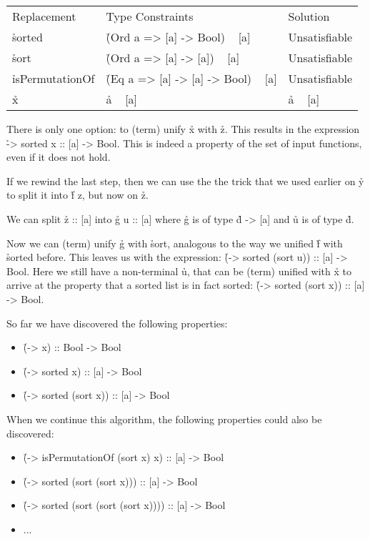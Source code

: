 \documentclass[a4paper, 11pt]{article}
\begin{document}
\begin{tabular}{lll}
  Replacement & Type Constraints & Solution \\
  \h{sorted} & \h{(Ord a => [a] -> Bool) ~ [a]} & Unsatisfiable \\
  \h{sort} & \h{(Ord a => [a] -> [a]) ~ [a]} & Unsatisfiable \\
  \h{isPermutationOf} & \h{(Eq a => [a] -> [a] -> Bool) ~ [a]} & Unsatisfiable \\
  \h{x} & \h{a ~ [a]} & \h{a ~ [a]} \\
\end{tabular}

There is only one option: to (term) unify \h{x} with \h{z}.
This results in the expression \h{\a -> sorted x :: [a] -> Bool}.
This is indeed a property of the set of input functions, even if it does not hold.

If we rewind the last step, then we can use the the trick that we used earlier on \h{y} to split it into \h{f z}, but now on \h{z}.

We can split \h{z :: [a]} into \h{g u :: [a]} where \h{g} is of type \h{d -> [a]} and \h{u} is of type \h{d}.

Now we can (term) unify \h{g} with \h{sort}, analogous to the way we unified \h{f} with \h{sorted} before.
This leaves us with the expression: \h{(\a -> sorted (sort u)) :: [a] -> Bool}.
Here we still have a non-terminal \h{u}, that can be (term) unified with \h{x} to arrive at the property that a sorted list is in fact sorted:
\h{(\x -> sorted (sort x)) :: [a] -> Bool}.

So far we have discovered the following properties:

\begin{itemize}
  \item \h{(\x -> x) :: Bool -> Bool}
  \item \h{(\x -> sorted x) :: [a] -> Bool}
  \item \h{(\x -> sorted (sort x)) :: [a] -> Bool}
\end{itemize}

When we continue this algorithm, the following properties could also be discovered:

\begin{itemize}
  \item \h{(\x -> isPermutationOf (sort x) x) :: [a] -> Bool}
  \item \h{(\x -> sorted (sort (sort x))) :: [a] -> Bool}
  \item \h{(\x -> sorted (sort (sort (sort x)))) :: [a] -> Bool}
  \item ...
\end{itemize}
\end{document}
